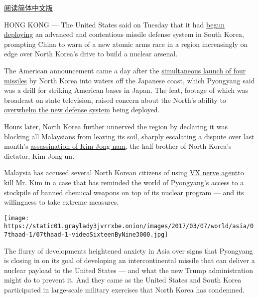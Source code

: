 \href{http://cn.nytimes3xbfgragh.onion/china/20170308/thaad-missile-defense-us-south-korea-china/}{阅读简体中文版}

HONG KONG --- The United States said on Tuesday that it had
\href{https://www.nytimes3xbfgragh.onion/2017/03/06/world/asia/north-korea-thaad-missile-defense-us-china.html}{begun
deploying} an advanced and contentious missile defense system in South
Korea, prompting China to warn of a new atomic arms race in a region
increasingly on edge over North Korea's drive to build a nuclear
arsenal.

The American announcement came a day after the
\href{https://www.nytimes3xbfgragh.onion/2017/03/05/world/north-korea-ballistic-missiles.html}{simultaneous
launch of four missiles} by North Korea into waters off the Japanese
coast, which Pyongyang said was a drill for striking American bases in
Japan. The feat, footage of which was broadcast on state television,
raised concern about the North's ability to
\href{https://www.nytimes3xbfgragh.onion/2017/03/06/world/asia/north-korea-missiles-japan.html}{overwhelm
the new defense system} being deployed.

Hours later, North Korea further unnerved the region by declaring it was
blocking all
\href{https://www.nytimes3xbfgragh.onion/2017/03/07/world/asia/kim-jong-nam-north-korea-malaysia-travel-ban.html?hp\&action=click\&pgtype=Homepage\&clickSource=story-heading\&module=first-column-region\&region=top-news\&WT.nav=top-news\&_r=0}{Malaysians
from leaving its soil}, sharply escalating a dispute over last month's
\href{https://www.nytimes3xbfgragh.onion/2017/02/22/world/asia/kim-jong-nam-assassination-korea-malaysia.html}{assassination
of Kim Jong-nam}, the half brother of North Korea's dictator, Kim
Jong-un.

Malaysia has accused several North Korean citizens of using
\href{https://www.nytimes3xbfgragh.onion/2017/02/24/world/asia/vx-nerve-agent-kim-jong-nam.html}{VX
nerve agent}to kill Mr. Kim in a case that has reminded the world of
Pyongyang's access to a stockpile of banned chemical weapons on top of
its nuclear program --- and its willingness to take extreme measures.

\texttt{[image: https://static01.graylady3jvrrxbe.onion/images/2017/03/07/world/asia/07thaad-1/07thaad-1-videoSixteenByNine3000.jpg]}

The flurry of developments heightened anxiety in Asia over signs that
Pyongyang is closing in on its goal of developing an intercontinental
missile that can deliver a nuclear payload to the United States --- and
what the new Trump administration might do to prevent it. And they came
as the United States and South Korea participated in large-scale
military exercises that North Korea has condemned.

